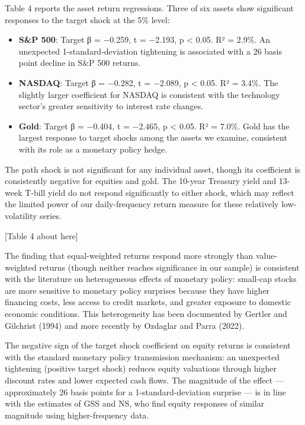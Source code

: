 \documentclass[
]{article}
\begin{document}
Table 4 reports the asset return regressions. Three of six assets show
significant responses to the target shock at the 5\% level:

\begin{itemize}
\item
  \textbf{S\&P 500}: Target β = −0.259, t = −2.193, p \textless{} 0.05.
  R² = 2.9\%. An unexpected 1-standard-deviation tightening is
  associated with a 26 basis point decline in S\&P 500 returns.
\item
  \textbf{NASDAQ}: Target β = −0.282, t = −2.089, p \textless{} 0.05. R²
  = 3.4\%. The slightly larger coefficient for NASDAQ is consistent with
  the technology sector's greater sensitivity to interest rate changes.
\item
  \textbf{Gold}: Target β = −0.404, t = −2.465, p \textless{} 0.05. R² =
  7.0\%. Gold has the largest response to target shocks among the assets
  we examine, consistent with its role as a monetary policy hedge.
\end{itemize}

The path shock is not significant for any individual asset, though its
coefficient is consistently negative for equities and gold. The 10-year
Treasury yield and 13-week T-bill yield do not respond significantly to
either shock, which may reflect the limited power of our daily-frequency
return measure for these relatively low-volatility series.

{[}Table 4 about here{]}

The finding that equal-weighted returns respond more strongly than
value-weighted returns (though neither reaches significance in our
sample) is consistent with the literature on heterogeneous effects of
monetary policy: small-cap stocks are more sensitive to monetary policy
surprises because they have higher financing costs, less access to
credit markets, and greater exposure to domestic economic conditions.
This heterogeneity has been documented by Gertler and Gilchrist (1994)
and more recently by Ozdaglar and Parra (2022).

The negative sign of the target shock coefficient on equity returns is
consistent with the standard monetary policy transmission mechanism: an
unexpected tightening (positive target shock) reduces equity valuations
through higher discount rates and lower expected cash flows. The
magnitude of the effect --- approximately 26 basis points for a
1-standard-deviation surprise --- is in line with the estimates of GSS
and NS, who find equity responses of similar magnitude using
higher-frequency data.
\end{document}
